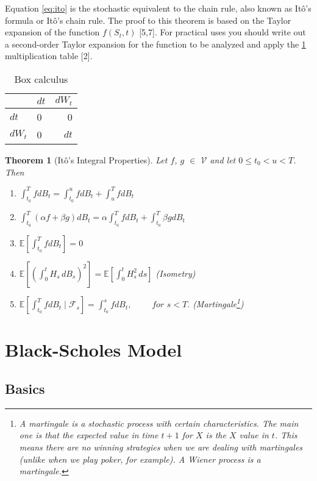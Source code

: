 \documentclass[12pt,twoside]{reedthesis}
\newtheorem{theorem}{Theorem}[section]
\theoremstyle{definition}
\theoremstyle{definition}
\theoremstyle{remark}
\begin{document}
  Equation \eqref{eq:ito} is the stochastic equivalent to the chain rule,
  also known as Itô's formula or Itô's chain rule. The proof to this
  theorem is based on the Taylor expansion of the function \(f(S_t, t)\)
  {[}5,7{]}. For practical uses you should write out a second-order Taylor
  expansion for the function to be analyzed and apply the
  \ref{tab:box-calc} multiplication table {[}2{]}.
  \begin{longtable}[t]{llr}
  \caption{\label{tab:box-calc}Box calculus}\\
  \toprule
    & $dt$ & $dW_t$\\
  \midrule
  $dt$ & 0 & 0\\
  $dW_t$ & 0 & $dt$\\
  \bottomrule
  \end{longtable}
  \begin{theorem}[Itô's Integral Properties]
  
  Let $f$, $g$ $\in$ $\mathcal{V}$ and let $0 \leq t_0 < u < T$. Then
  \begin{enumerate}[label=(\roman*)]
    \item $\int_{t_0}^{T}{f dB_t} = \int_{t_0}^{u}{f dB_t} + \int_{u}^{T}{f dB_t}$
    \item $\int_{t_0}^{T}{(\alpha f + \beta g) dB_t} = \alpha  \int_{t_0}^{T}{f dB_t} + \int_{t_0}^{T}{ \beta g dB_t}$
    \item $\mathbb{E}\left[ \int_{t_0}^{T}{fdB_t}\right] = 0 $
    \item $\mathbb {E} \left[\left(\int_{0}^{t}H_{s}\,dB_{s}\right)^{2}\right]=\mathbb {E} \left[\int _{0}^{t}H_{s}^{2}\,ds\right]$ (Isometry)
    \item $ \mathbb {E}\left[ \int_{t_0}^{T}{f dB_t \mid \mathcal{F}_{s}} \right] = \int_{t_0}^{s}{f dB_t}, \,\,\,\,\,\,\,\,\,\,\,\,\,\, for \,\, s < T.$  (Martingale\footnote{A martingale is a stochastic process with certain characteristics. The main one is that the expected value in time $t+1$ for $X$ is the $X$ value in $t$. This means there are no winning strategies when we are dealing with martingales (unlike when we play poker, for example). A Wiener process is a martingale.})
  \end{enumerate}
  \end{theorem}
  \section{Black-Scholes Model}\label{black-scholes-model}
  
  \subsection{Basics}\label{basics}
  
\end{document}
